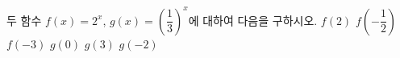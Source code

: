두 함수 $f(x)=2^x$, $g(x)=\left(\dfrac{1}{3}\right)^{x}$에 대하여 다음을 구하시오.
 $f(2)$
 $f\left(-\dfrac{1}{2}\right)$
 $f(-3)$
 $g(0)$
 $g(3)$
 $g(-2)$
